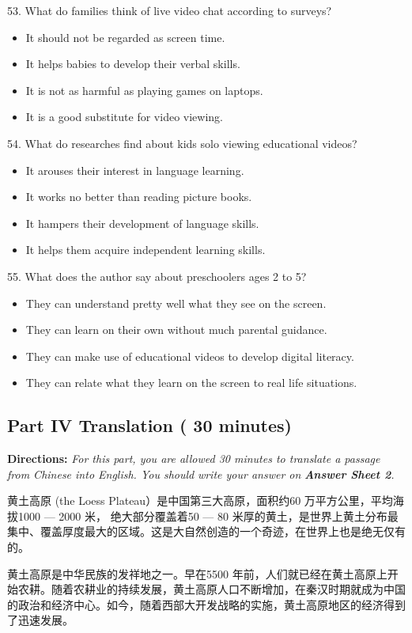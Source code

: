 \documentclass[UTF8,11pt]{ctexart}
\begin{document}
53. What do families think of live video chat according to surveys?


\begin{itemize}[leftmargin=2em,itemsep=.2em,topsep=.4em]\item[A.] It should not be regarded as screen time.
\item[B.] It helps babies to develop their verbal skills.
\item[C.] It is not as harmful as playing games on laptops.
\item[D.] It is a good substitute for video viewing.
\end{itemize}

54. What do researches find about kids solo viewing educational videos?


\begin{itemize}[leftmargin=2em,itemsep=.2em,topsep=.4em]\item[A.] It arouses their interest in language learning.
\item[B.] It works no better than reading picture books.
\item[C.] It hampers their development of language skills.
\item[D.] It helps them acquire independent learning skills.
\end{itemize}

55. What does the author say about preschoolers ages 2 to 5?


\begin{itemize}[leftmargin=2em,itemsep=.2em,topsep=.4em]\item[A.] They can understand pretty well what they see on the screen.
\item[B.] They can learn on their own without much parental guidance.
\item[C.] They can make use of educational videos to develop digital literacy.
\item[D.] They can relate what they learn on the screen to real life situations.
\end{itemize}

\subsection*{\textbf{Part IV Translation} \textbf{( 30 minutes)}}


\textbf{Directions: }\textit{For this part, you are allowed 30 minutes to translate a passage from Chinese into English. You should} \textit{write your answer on }\textbf{\textit{Answer Sheet 2}}\textit{.}


黄土高原 (the Loess Plateau）是中国第三大高原，面积约60 万平方公里，平均海拔1000 — 2000 米， 绝大部分覆盖着50 — 80 米厚的黄土，是世界上黄土分布最集中、覆盖厚度最大的区域。这是大自然创造的一个奇迹，在世界上也是绝无仅有的。


黄土高原是中华民族的发祥地之一。早在5500 年前，人们就已经在黄土高原上开始农耕。随着农耕业的持续发展，黄土高原人口不断增加，在秦汉时期就成为中国的政治和经济中心。如今，随着西部大开发战略的实施，黄土高原地区的经济得到了迅速发展。
\end{document}
